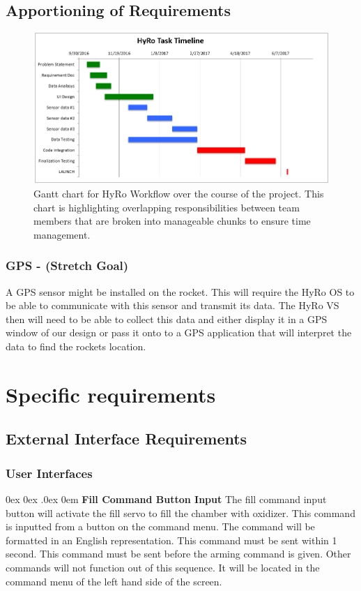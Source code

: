 \documentclass[10pt,draftclsnofoot,onecolumn,compsoc]{IEEEtran}
\makeatletter
\renewcommand\paragraph{\@startsection{paragraph}{4}{\z@}%
                                    {0ex \@plus0ex \@minus.0ex}%
                                    {0em}%
                                    {\normalfont\normalsize\bfseries}}
\makeatother
\begin{document}
\subsection{Apportioning of Requirements}
\begin{figure}
  \caption{Gantt chart for HyRo Workflow over the course of the project. This chart is highlighting overlapping responsibilities between team members that are broken into manageable chunks to ensure time management. }
  \centering
	\includegraphics[scale=.75]{GanntChart}
\end{figure}
\FloatBarrier
\subsubsection{\bf GPS - (Stretch Goal)} A GPS sensor might be installed on the rocket. This will require the HyRo OS to be able to communicate with this sensor and transmit its data. The HyRo VS then will need to be able to collect this data and either display it in a GPS window of our design or pass it onto to a GPS application that will interpret the data to find the rockets location.

\section{ Specific requirements}
\subsection{External Interface Requirements}
\subsubsection{ User Interfaces}
\paragraph {\bf Fill Command Button Input}
The fill command input button will activate the fill servo to fill the chamber with oxidizer. This command is inputted from a button on the command menu. The command will be formatted in an English representation.  This command must be sent within 1 second. This command must be sent before the arming command is given. Other commands will not function out of this sequence. It will be located in the command menu of the left hand side of the screen.
\end{document}

